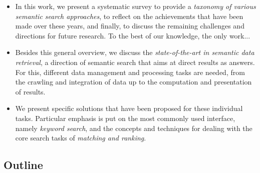 \begin{itemize}
	\item In this work, we present a systematic survey to provide a \emph{taxonomy of various semantic search approaches}, to reflect on the achievements that have been made over these years, and finally, to discuss the remaining challenges and directions for future research. To the best of our knowledge, the only work... 
	\item Besides this general overview, we discuss the \emph{state-of-the-art in semantic data retrieval}, a direction of semantic search that aims at direct results as answers. For this, different data management and processing tasks are needed, from the crawling and integration of data up to the computation and presentation of results. 
	\item We present specific solutions that have been proposed for these individual tasks. Particular emphasis is put on the most commonly used interface, namely \emph{keyword search}, and the concepts and techniques for dealing with the core search tasks of \emph{matching and ranking}. 
 
\end{itemize}


\subsection{Outline}
